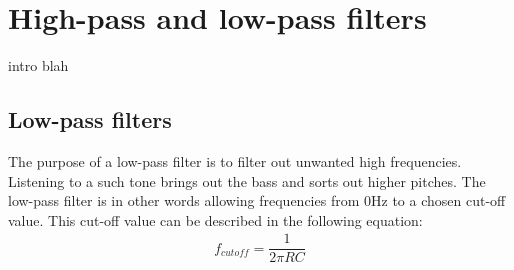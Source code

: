\chapter{High-pass and low-pass filters}
intro blah

\section{Low-pass filters}
The purpose of a low-pass filter is to filter out unwanted high frequencies. Listening to a such tone brings out the bass and sorts out higher pitches. The low-pass filter is in other words allowing frequencies from 0Hz to a chosen cut-off value. This cut-off value can be described in the following equation:
\begin{align*}
f_{cutoff}=\dfrac{1}{2 \pi RC}
\end{align*}
